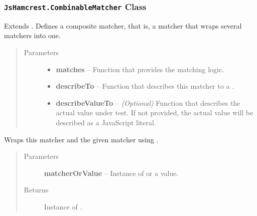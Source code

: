\documentclass[letterpaper,10pt,english]{sphinxmanual}
\begin{document}
\subsubsection{\texttt{JsHamcrest.CombinableMatcher} Class}
\label{modules/jshamcrest:jshamcrest-combinablematcher-class}

\begin{fulllineitems}
\label{modules/jshamcrest:JsHamcrest.CombinableMatcher}
Extends {\hyperref[modules/jshamcrest:JsHamcrest.SimpleMatcher]{}}. Defines a composite matcher, that
is, a matcher that wraps several matchers into one.
\begin{quote}\begin{description}
\item[{Parameters}] \leavevmode\begin{itemize}
\item {} 
\textbf{matches} -- Function that provides the matching logic.

\item {} 
\textbf{describeTo} -- Function that describes this matcher to a
{\hyperref[modules/jshamcrest:JsHamcrest.Description]{}}.

\item {} 
\textbf{describeValueTo} -- \emph{(Optional)} Function that describes the actual value
under test. If not provided, the actual value will be
described as a JavaScript literal.

\end{itemize}

\end{description}\end{quote}

\end{fulllineitems}


\begin{fulllineitems}
\label{modules/jshamcrest:JsHamcrest.CombinableMatcher.and}
Wraps this matcher and the given matcher using {\hyperref[modules/matchers:JsHamcrest.Matchers.allOf]{}}.
\begin{quote}\begin{description}
\item[{Parameters}] \leavevmode
\textbf{matcherOrValue} -- Instance of {\hyperref[modules/jshamcrest:JsHamcrest.SimpleMatcher]{}} or a
value.

\item[{Returns}] \leavevmode
Instance of {\hyperref[modules/jshamcrest:JsHamcrest.CombinableMatcher]{}}.

\end{description}\end{quote}

\end{fulllineitems}
\end{document}
